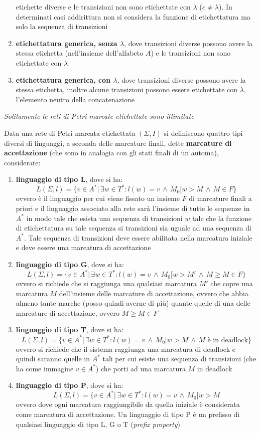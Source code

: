 \documentclass[a4paper,12pt, oneside]{book}
\begin{document}
\begin{definizione}
\begin{enumerate}
    etichette diverse e le transizioni non sono etichettate con $\lambda$
    ($e\neq \lambda$). In determinati casi addirittura non si considera la
    funzione di etichettatura ma solo la sequenza di transizioni
    \item \textbf{etichettatura generica, senza $\lambda$}, dove transizioni
    diverse possono avere la stessa etichetta (nell'insieme dell'alfabeto $A$) e
    le transizioni non sono etichettate con $\lambda$ 
    \item \textbf{etichettatura generica, con $\lambda$}, dove transizioni
    diverse possono avere la stessa etichetta, inoltre alcune transizioni
    possono essere etichettate con $\lambda$, l’elemento neutro della
    concatenazione
  \end{enumerate}
  \textit{Solitamente le reti di Petri marcate etichettate sono illimitate}
\end{definizione}
Data una rete di Petri marcata etichettata $(\Sigma, I)$ si definiscono quattro
tipi diversi di linguaggi, a seconda delle marcature finali, dette
\textbf{marcature di accettazione} (che sono in analogia con gli stati finali di
un automa), considerate: 
\begin{enumerate}
  \item \textbf{linguaggio di tipo L}, dove si ha:
  \[L(\Sigma,l)=\{v\in A^*|\,\exists w\in T^*:l(w)=v\,\land\, M_0[w>M\,\land\,
    M\in F\}\]
  ovvero è il linguaggio per cui viene fissato un insieme $F$ di marcature
  finali a priori e il linguaggio associato alla rete sarà l'insieme di tutte le
  sequenze in $A^*$ in modo tale che esista una sequenza di transizioni $w$ tale
  che la funzione di etichettatura su tale sequenza si transizioni sia uguale
  ad una sequenza di $A^*$. Tale sequenza di transizioni deve essere abilitata
  nella marcatura iniziale e deve essere una marcatura di accettazione
  \item \textbf{linguaggio di tipo G}, dove si ha:
  \[L(\Sigma,l)=\{v\in A^*|\,\exists w\in T^*:l(w)=v\,\land\, M_0[w>M'\,\land\,
    M\geq M\in F\}\]
  ovvero si richiede che si raggiunga una qualsiasi marcatura $M'$ che copre una
  marcatura $M$ dell'insieme delle marcature di accettazione, ovvero che abbia
  almeno tante marche (posso quindi averne di più) quante quelle di una delle
  marcature di accettazione, ovvero $M\geq M\in F$
  \item \textbf{linguaggio di tipo T}, dove si ha:
  \[L(\Sigma,l)=\{v\in A^*|\,\exists w\in T^*:l(w)=v\,\land\, M_0[w>M\,\land\,
    M \mbox{ è in deadlock}\}\]
  ovvero si richiede che il sistema raggiunga una marcatura di deadlock e quindi
  saranno quelle in $A^*$ tali per cui esiste una sequenza di transizioni (che
  ha come immagine $v\in A^*$) che porti ad una marcatura $M$ in deadlock
  \item \textbf{linguaggio di tipo P}, dove si ha:
  \[L(\Sigma,l)=\{v\in A^*|\,\exists w\in T^*:l(w)=v\,\land\, M_0[w>M\]
  ovvero dove ogni marcatura raggiungibile da quella iniziale è considerata come
  marcatura di accettazione. Un linguaggio di tipo P è un prefisso di qualsiasi
  linguaggio di tipo L, G o T (\textit{prefix property})
\end{enumerate}
\end{document}
